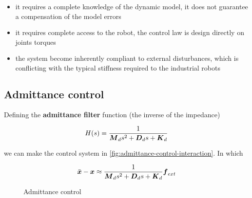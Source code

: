\begin{itemize}
	\item it requires a complete knowledge of the dynamic model, it does not guarantee a compensation of the model errors
	\item it requires complete access to the robot, the control law is design directly on joints torques
	\item the system become inherently compliant to external disturbances, which is conflicting with the typical stiffness required to the industrial robots
\end{itemize}

\subsection{Admittance control}

Defining the \textbf{admittance filter} function (the inverse of the impedance)

\[
	H(s) = \frac{1}{\boldsymbol{M}_d s^2 + \boldsymbol{D}_d s + \boldsymbol{K}_d}
\]

we can make the control system in \autoref{fig:admittance-control-interaction}.
In which

\[
	\bar{\boldsymbol{x}} - \boldsymbol{x} \approx \frac{1}{\boldsymbol{M}_d s^2 + \boldsymbol{D}_d s + \boldsymbol{K}_d} \boldsymbol{f}_{ext}
\]

\begin{figure}[htb]
	\centering
	\caption{Admittance control}
	\label{fig:admittance-control-interaction}
\end{figure}

